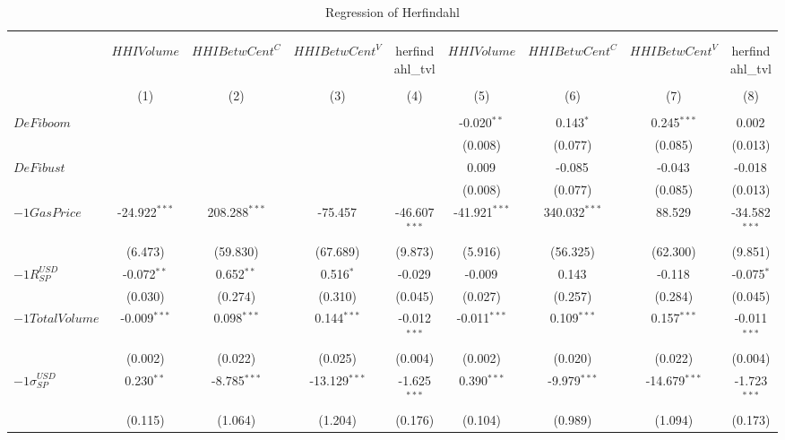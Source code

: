 \begin{table}[!htbp] \centering
  \caption{Regression of Herfindahl}
\begin{tabular}{@{\extracolsep{5pt}}lcccccccc}
\\[-1.8ex]\hline
\hline \\[-1.8ex]
\\[-1.8ex] & \multicolumn{1}{c}{${	 HHIVolume}$} & \multicolumn{1}{c}{${	 HHIBetwCent}^C$} & \multicolumn{1}{c}{${	 HHIBetwCent}^V$} & \multicolumn{1}{c}{herfindahl_tvl} & \multicolumn{1}{c}{${	 HHIVolume}$} & \multicolumn{1}{c}{${	 HHIBetwCent}^C$} & \multicolumn{1}{c}{${	 HHIBetwCent}^V$} & \multicolumn{1}{c}{herfindahl_tvl}  \\
\\[-1.8ex] & (1) & (2) & (3) & (4) & (5) & (6) & (7) & (8) \\
\hline \\[-1.8ex]
 ${	 DeFiboom}$ & & & & & -0.020$^{**}$ & 0.143$^{*}$ & 0.245$^{***}$ & 0.002$^{}$ \\
  & & & & & (0.008) & (0.077) & (0.085) & (0.013) \\
 ${	 DeFibust}$ & & & & & 0.009$^{}$ & -0.085$^{}$ & -0.043$^{}$ & -0.018$^{}$ \\
  & & & & & (0.008) & (0.077) & (0.085) & (0.013) \\
 ${	-1 GasPrice}$ & -24.922$^{***}$ & 208.288$^{***}$ & -75.457$^{}$ & -46.607$^{***}$ & -41.921$^{***}$ & 340.032$^{***}$ & 88.529$^{}$ & -34.582$^{***}$ \\
  & (6.473) & (59.830) & (67.689) & (9.873) & (5.916) & (56.325) & (62.300) & (9.851) \\
 ${	-1 R}^{USD}_{SP}$ & -0.072$^{**}$ & 0.652$^{**}$ & 0.516$^{*}$ & -0.029$^{}$ & -0.009$^{}$ & 0.143$^{}$ & -0.118$^{}$ & -0.075$^{*}$ \\
  & (0.030) & (0.274) & (0.310) & (0.045) & (0.027) & (0.257) & (0.284) & (0.045) \\
 ${	-1 TotalVolume}$ & -0.009$^{***}$ & 0.098$^{***}$ & 0.144$^{***}$ & -0.012$^{***}$ & -0.011$^{***}$ & 0.109$^{***}$ & 0.157$^{***}$ & -0.011$^{***}$ \\
  & (0.002) & (0.022) & (0.025) & (0.004) & (0.002) & (0.020) & (0.022) & (0.004) \\
 ${	-1 \sigma}^{USD}_{SP}$ & 0.230$^{**}$ & -8.785$^{***}$ & -13.129$^{***}$ & -1.625$^{***}$ & 0.390$^{***}$ & -9.979$^{***}$ & -14.679$^{***}$ & -1.723$^{***}$ \\
  & (0.115) & (1.064) & (1.204) & (0.176) & (0.104) & (0.989) & (1.094) & (0.173) \\

\end{tabular}
\end{table}
